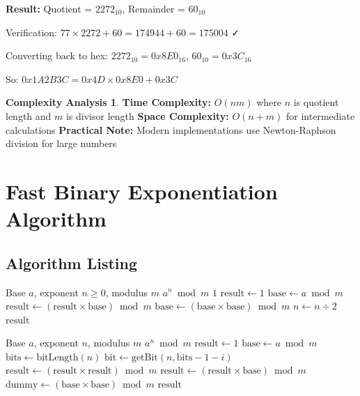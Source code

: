 \documentclass[12pt,a4paper]{article}
\theoremstyle{definition}
\newtheorem{complexity}{Complexity Analysis}[section]
\begin{document}
\textbf{Result:} Quotient = $2272_{10}$, Remainder = $60_{10}$

Verification: $77 \times 2272 + 60 = 174944 + 60 = 175004$ ✓

Converting back to hex: $2272_{10} = 0x8E0_{16}$, $60_{10} = 0x3C_{16}$

So: $0x1A2B3C = 0x4D \times 0x8E0 + 0x3C$

\begin{complexity}
\textbf{Time Complexity:} $O(nm)$ where $n$ is quotient length and $m$ is divisor length
\textbf{Space Complexity:} $O(n + m)$ for intermediate calculations
\textbf{Practical Note:} Modern implementations use Newton-Raphson division for large numbers
\end{complexity}

\section{Fast Binary Exponentiation Algorithm}

\subsection{Algorithm Listing}

\begin{algorithm}[H]
\caption{Fast Binary Exponentiation}
\label{alg:fast-exponentiation}
\begin{algorithmic}[1]
\REQUIRE Base $a$, exponent $n \geq 0$, modulus $m$
\ENSURE $a^n \bmod m$
    \RETURN $1$
\ENDIF
\STATE $\text{result} \leftarrow 1$
\STATE $\text{base} \leftarrow a \bmod m$
        \STATE $\text{result} \leftarrow (\text{result} \times \text{base}) \bmod m$
    \ENDIF
    \STATE $\text{base} \leftarrow (\text{base} \times \text{base}) \bmod m$
    \STATE $n \leftarrow n \div 2$
\ENDWHILE
\RETURN $\text{result}$
\end{algorithmic}
\end{algorithm}

\begin{algorithm}[H]
\caption{Constant-Time Binary Exponentiation}
\label{alg:constant-time-exp}
\begin{algorithmic}[1]
\REQUIRE Base $a$, exponent $n$, modulus $m$
\ENSURE $a^n \bmod m$
\STATE $\text{result} \leftarrow 1$
\STATE $\text{base} \leftarrow a \bmod m$
\STATE $\text{bits} \leftarrow \text{bitLength}(n)$
    \STATE $\text{bit} \leftarrow \text{getBit}(n, \text{bits} - 1 - i)$
    \STATE $\text{result} \leftarrow (\text{result} \times \text{result}) \bmod m$
        \STATE $\text{result} \leftarrow (\text{result} \times \text{base}) \bmod m$
    \ELSE
        \STATE $\text{dummy} \leftarrow (\text{base} \times \text{base}) \bmod m$ 
    \ENDIF
\ENDFOR
\RETURN $\text{result}$
\end{algorithmic}
\end{algorithm}
\end{document}
